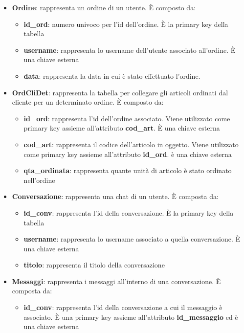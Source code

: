 \begin{itemize}
\begin{itemize}
		\item \textbf{admin}: booleano che identifica se un utente è admin oppure no
	\end{itemize}
	\item \textbf{Ordine}: rappresenta un ordine di un utente. È composto da:
		\begin{itemize}
			\item \textbf{id\_ord}: numero univoco per l'id dell'ordine. È la primary key della tabella
			\item \textbf{username}: rappresenta lo username dell'utente associato all'ordine. È una chiave esterna
			\item \textbf{data}: rappresenta la data in cui è stato effettuato l'ordine.
		\end{itemize}
	\item \textbf{OrdCliDet}: rappresenta la tabella per collegare gli articoli ordinati dal cliente per un determinato ordine. È composto da:
	\begin{itemize}
		\item \textbf{id\_ord}: rappresenta l'id dell'ordine associato. Viene utilizzato come primary key assieme all'attributo \textbf{cod\_art}. È una chiave esterna
		\item \textbf{cod\_art}: rappresenta il codice dell'articolo in oggetto. Viene utilizzato come primary key assieme all'attributo \textbf{id\_ord}. è una chiave esterna 
		\item \textbf{qta\_ordinata}: rappresenta quante unità di articolo  è stato ordinato nell'ordine 
	\end{itemize}
	\item \textbf{Conversazione}: rappresenta una chat di un utente. È composta da:
	\begin{itemize}
		\item \textbf{id\_conv}: rappresenta l'id della conversazione. È la primary key della tabella
		\item \textbf{username}: rappresenta lo username associato a quella conversazione. È una chiave esterna
		\item \textbf{titolo}: rappresenta il titolo della conversazione
	\end{itemize}
	\item \textbf{Messaggi}: rappresenta i messaggi all'interno di una conversazione. È composta da:
	\begin{itemize}
		\item \textbf{id\_conv}: rappresenta l'id della conversazione a cui il messaggio è associato. È una primary key assieme all'attributo \textbf{id\_messaggio} ed è una chiave esterna

\end{itemize}
\end{itemize}
